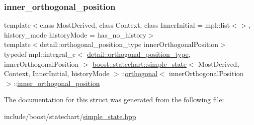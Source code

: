 \subsubsection{\texorpdfstring{inner\+\_\+orthogonal\+\_\+position}{inner\_orthogonal\_position}}
{\footnotesize\ttfamily template$<$class Most\+Derived, class Context, class Inner\+Initial = mpl\+::list$<$$>$, history\+\_\+mode history\+Mode = has\+\_\+no\+\_\+history$>$ \\
template$<$detail\+::orthogonal\+\_\+position\+\_\+type inner\+Orthogonal\+Position$>$ \\
typedef mpl\+::integral\+\_\+c$<$ \mbox{\hyperlink{namespaceboost_1_1statechart_1_1detail_a3bedea0b807a16fa222733417183d2c9}{detail\+::orthogonal\+\_\+position\+\_\+type}}, inner\+Orthogonal\+Position $>$ \mbox{\hyperlink{classboost_1_1statechart_1_1simple__state}{boost\+::statechart\+::simple\+\_\+state}}$<$ Most\+Derived, Context, Inner\+Initial, history\+Mode $>$\+::\mbox{\hyperlink{structboost_1_1statechart_1_1simple__state_1_1orthogonal}{orthogonal}}$<$ inner\+Orthogonal\+Position $>$\+::\mbox{\hyperlink{structboost_1_1statechart_1_1simple__state_1_1orthogonal_aac234f0598846fe09031205a35a774c3}{inner\+\_\+orthogonal\+\_\+position}}}



The documentation for this struct was generated from the following file\+:\begin{DoxyCompactItemize}
\item 
include/boost/statechart/\mbox{\hyperlink{simple__state_8hpp}{simple\+\_\+state.\+hpp}}\end{DoxyCompactItemize}
